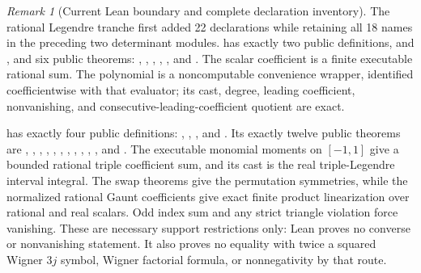 \documentclass[11pt,oneside]{article}
\theoremstyle{definition}
\theoremstyle{remark}
\newtheorem{remark}[theorem]{Remark}
\numberwithin{equation}{section}
\begin{document}
\begin{remark}[Current Lean boundary and complete declaration inventory]
The rational Legendre tranche first added 22 declarations while retaining all 18 names
in the preceding two determinant modules.  
has exactly two public definitions,  and
, and six public theorems:
, ,
,
,
, and
.  The scalar coefficient is a
finite executable rational sum.  The polynomial is a noncomputable convenience wrapper,
identified coefficientwise with that evaluator; its cast, degree, leading coefficient,
nonvanishing, and consecutive-leading-coefficient quotient are exact.

 has exactly four public definitions:
, ,
, and .  Its exactly
twelve public theorems are
,
,
,
,
,
,
,
,
,
,
, and
.
The executable monomial moments on \([-1,1]\) give a bounded rational triple
coefficient sum, and its cast is the real triple-Legendre interval integral.  The swap
theorems give the permutation symmetries, while the normalized rational Gaunt
coefficients give exact finite product linearization over rational and real scalars.
Odd index sum and any strict triangle violation force vanishing.  These
are necessary support restrictions only: Lean proves no converse or nonvanishing
statement.  It also proves no equality with twice a squared Wigner \(3j\) symbol,
Wigner factorial formula, or nonnegativity by that route.


\end{remark}
\end{document}
